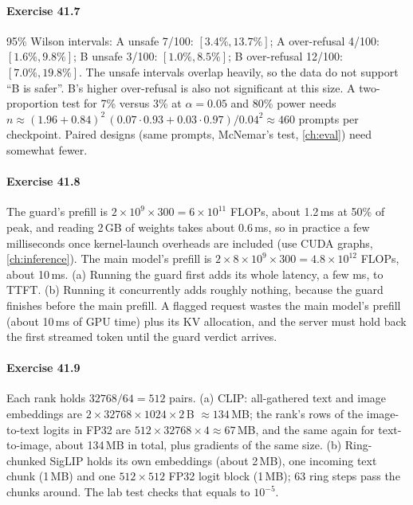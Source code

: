 \paragraph{Exercise 41.7} 95\% Wilson intervals: A unsafe 7/100: $[3.4\%,13.7\%]$; A over-refusal 4/100:
$[1.6\%,9.8\%]$; B unsafe 3/100: $[1.0\%,8.5\%]$; B over-refusal 12/100: $[7.0\%,19.8\%]$. The unsafe
intervals overlap heavily, so the data do not support ``B is safer''. B's higher over-refusal is also
not significant at this size. A two-proportion test for 7\% versus 3\% at $\alpha=0.05$ and 80\% power needs
$n\approx(1.96+0.84)^2\,(0.07\cdot0.93+0.03\cdot0.97)/0.04^2\approx460$ prompts per checkpoint.
Paired designs (same prompts, McNemar's test, \cref{ch:eval}) need somewhat fewer.

\paragraph{Exercise 41.8} The guard's prefill is $2\times10^9\times300=6\times10^{11}$ FLOPs, about 1.2\,ms at 50\% of peak,
and reading 2\,GB of weights takes about 0.6\,ms, so in practice a few milliseconds once kernel-launch
overheads are included (use CUDA graphs, \cref{ch:inference}). The main model's prefill is
$2\times8\times10^9\times300=4.8\times10^{12}$ FLOPs, about 10\,ms. (a) Running the guard first adds its whole latency, a few ms, to
TTFT. (b) Running it concurrently adds roughly nothing, because the guard finishes before the main prefill. A flagged request
wastes the main model's prefill (about 10\,ms of GPU time) plus its KV allocation, and the server must hold
back the first streamed token until the guard verdict arrives.

\paragraph{Exercise 41.9} Each rank holds $32768/64=512$ pairs. (a) CLIP: all-gathered text and image
embeddings are $2\times32768\times1024\times2$\,B $\approx134$\,MB; the rank's rows of the image-to-text logits in FP32 are
$512\times32768\times4\approx67$\,MB, and the same again for text-to-image, about 134\,MB in total, plus gradients of
the same size. (b) Ring-chunked SigLIP holds its own embeddings (about 2\,MB), one incoming text chunk (1\,MB)
and one $512\times512$ FP32 logit block (1\,MB); 63 ring steps pass the chunks around. The lab test
checks that  equals  to $10^{-5}$.

